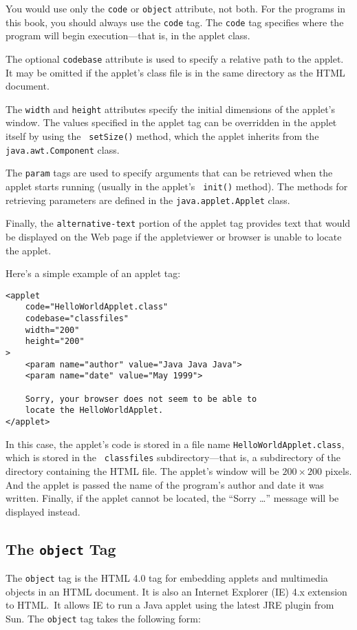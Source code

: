 \noindent You would use only the {\tt code} or {\tt object} attribute,
not both.  For the programs in this book, you should always use the
{\tt code} tag.  The {\tt code} tag specifies where the program
will begin execution---that is, in the applet class.

The optional {\tt codebase} attribute is used to specify a relative
path to the applet.  It may be omitted if the applet's class file is in
the same directory as the HTML document.

The {\tt width} and {\tt height} attributes specify the initial
dimensions of the applet's window.  The values specified in the applet
tag can be overridden in the applet itself by using the {\tt
setSize()} method, which the applet inherits from the {\tt
java.awt.Component} class.

The {\tt param} tags are used to specify arguments that can be
retrieved when the applet starts running (usually in the applet's {\tt
init()} method).  The methods for retrieving parameters are defined
in the {\tt java.applet.Applet} class.

Finally, the {\tt alternative-text} portion of the applet tag provides
text that would be displayed on the Web page if the appletviewer or
browser is unable to locate the applet.

Here's a simple example of an applet tag:

\begin{jjjlisting}
\begin{lstlisting}
<applet
    code="HelloWorldApplet.class"
    codebase="classfiles"
    width="200"
    height="200"
>
    <param name="author" value="Java Java Java">
    <param name="date" value="May 1999">

    Sorry, your browser does not seem to be able to
    locate the HelloWorldApplet.
</applet>
\end{lstlisting}
\end{jjjlisting}

\noindent In this case, the applet's code is stored in a
file name {\tt HelloWorld\-Applet.class}, which is stored in the {\tt
classfiles} subdirectory---that is, a subdirectory of the directory
containing the HTML file.   The applet's window will be $200 \times 200$
pixels.  And the applet is passed the name of the program's author and
date it was written.  Finally, if the applet cannot be located, the
``Sorry \dots '' message will be displayed instead.

\subsection*{The {\tt object} Tag}
\noindent The {\tt object} tag is the HTML 4.0 tag for embedding applets and
multimedia objects in an HTML document.  It is also an Internet
Explorer (IE) 4.x extension to HTML.~It allows IE to run a Java applet
using the latest JRE plugin from Sun.  The {\tt object} tag takes the
following form:

